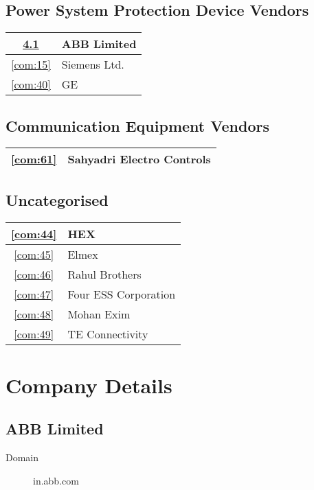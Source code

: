 \documentclass[a4paper, 11pt, twoside]{book}
\begin{document}
\section{Power System Protection Device Vendors}\label{cat:13}
\begin{tabular}{|c|l|}
\hline
\ref{com:11} & ABB Limited \\ \hline
\ref{com:15} & Siemens Ltd. \\ \hline
\ref{com:40} & GE \\ \hline
\end{tabular}
\section{Communication Equipment Vendors}\label{cat:14}
\begin{tabular}{|c|l|}
\hline
\ref{com:61} & Sahyadri Electro Controls \\ \hline
\end{tabular}
\section{Uncategorised}\label{cat:15}
\begin{tabular}{|c|l|}
\hline
\ref{com:44} & HEX \\ \hline
\ref{com:45} & Elmex \\ \hline
\ref{com:46} & Rahul Brothers \\ \hline
\ref{com:47} & Four ESS Corporation \\ \hline
\ref{com:48} & Mohan Exim \\ \hline
\ref{com:49} & TE Connectivity \\ \hline
\end{tabular}
\chapter{Company Details}
\section{ABB Limited}\label{com:11}
\begin{description}
\item[Domain]in.abb.com
\end{description}
\end{document}
